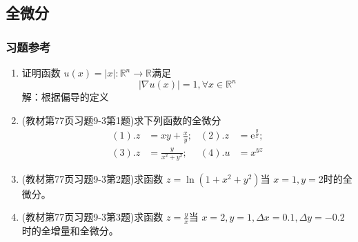 \subsection{全微分}
\subsubsection{习题参考}
\begin{enumerate}
    \item 证明函数 $u(x)=|x|:\mathbb{R} ^n \to \mathbb{R}$满足
    $$
    |\nabla u(x) | = 1, \forall x \in \mathbb{R}^n
    $$
    解：根据偏导的定义
    
    \item (教材第77页习题9-3第1题)求下列函数的全微分
    \begin{align*}
    (1). z & = x y + \frac{x}{y}; &  (2). z &= \mathrm{e}^{\frac{y}{x}}; \\
    (3). z &= \frac{y}{x^2 + y^2}; & (4). u & = x^{yz}
    \end{align*}
    
    \item (教材第77页习题9-3第2题)求函数 $z = \ln (1+x^2 + y^2)$当 $x=1,y=2$时的全微分。
    
    \item (教材第77页习题9-3第3题)求函数 $z = \frac{y}{x}$当 $x=2,y=1, \Delta x = 0.1, \Delta y = -0.2$时的全增量和全微分。
\end{enumerate}